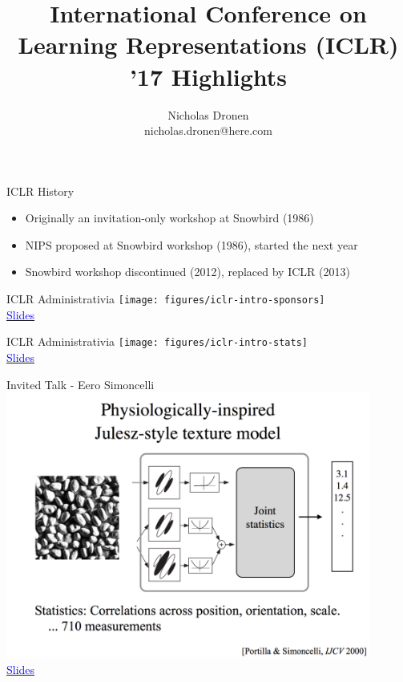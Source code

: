 \documentclass[]{beamer}
\begin{document}

\title{International Conference on Learning Representations (ICLR) '17 Highlights}
\author{Nicholas Dronen \\ nicholas.dronen@here.com}

\begin{frame}
\maketitle
\end{frame}

\begin{frame}{ICLR History}
\begin{itemize}
\item Originally an invitation-only workshop at Snowbird (1986)
\item NIPS proposed at Snowbird workshop (1986), started the next year
\item Snowbird workshop discontinued (2012), replaced by ICLR (2013)
\end{itemize}
\end{frame}

\begin{frame}{ICLR Administrativia}
\centering
\texttt{[image: figures/iclr-intro-sponsors]} \\
\href{http://iclr.cc/lib/exe/fetch.php?media=iclr2017:ranzato\_introduction\_iclr2017.pdf}{\textcolor{blue}{Slides}}
\end{frame}

\begin{frame}{ICLR Administrativia}
\centering
\texttt{[image: figures/iclr-intro-stats]} \\
\href{http://iclr.cc/lib/exe/fetch.php?media=iclr2017:ranzato\_introduction\_iclr2017.pdf}{\textcolor{blue}{Slides}}
\end{frame}

\begin{frame}{Invited Talk - Eero Simoncelli}
\centering
\includegraphics[width=0.9\textwidth]{figures/simoncelli-julesz-model} \\
\href{http://iclr.cc/lib/exe/fetch.php?media=iclr2017:simoncelli\_iclr2017.pdf}{\textcolor{blue}{Slides}}
\end{frame}
\end{document}
